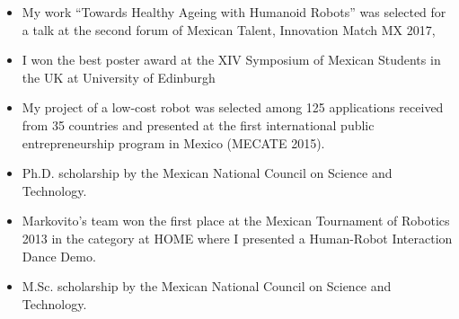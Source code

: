 \documentclass{mycv}
\begin{document}
\begin{itemize}
\item My work ``Towards Healthy Ageing with Humanoid Robots'' was selected for a talk at the second forum of Mexican Talent, Innovation Match MX 2017, \href{https://github.com/mxochicale/InnovationMatchMX/tree/master/2017}{\faExternalLink*} \href{https://github.com/mxochicale/InnovationMatchMX/blob/master/2017/presentation/IMMX-MA-0058.pdf}{\faFilePdf} \href{https://www.youtube.com/watch?v=wNWzpdXdm5U}{\faYoutube} 

\item I won the best poster award at the XIV Symposium of Mexican Students in the UK at University of Edinburgh \href{https://github.com/mxochicale/symposiummx/tree/master/2016}{\faExternalLink*}  

\item My project of a low-cost robot was selected among 125 applications received from 35 countries and presented at the first international public entrepreneurship program in Mexico (MECATE 2015). \href{http://let-emprendimientopublico.mx/en/portfolio_category/mecate-primera-generacion-en/}{\faExternalLink*} \href{https://www.youtube.com/watch?v=VjVGnwD422g}{\faYoutube} 

\item Ph.D. scholarship by the Mexican National Council on Science and Technology. 

\item Markovito's team  won the first place at the Mexican Tournament of Robotics 2013 in the category at HOME where I presented a Human-Robot Interaction Dance Demo. \href{https://www.youtube.com/watch?v=Kw-lZam_qZI}{\faYoutube} 

\item M.Sc. scholarship by the Mexican National Council on Science and Technology. 
\end{itemize}

\end{document}
